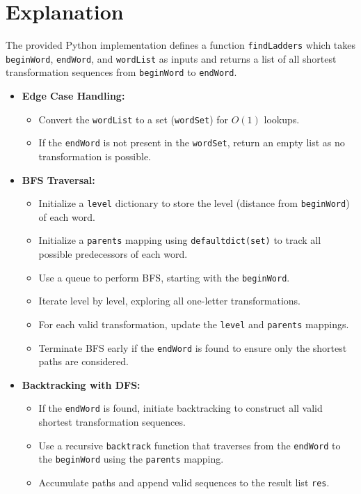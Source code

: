 \section*{Explanation}

The provided Python implementation defines a function \texttt{findLadders} which takes \texttt{beginWord}, \texttt{endWord}, and \texttt{wordList} as inputs and returns a list of all shortest transformation sequences from \texttt{beginWord} to \texttt{endWord}.

\begin{itemize}
    \item \textbf{Edge Case Handling:}
    \begin{itemize}
        \item Convert the \texttt{wordList} to a set (\texttt{wordSet}) for \(O(1)\) lookups.
        \item If the \texttt{endWord} is not present in the \texttt{wordSet}, return an empty list as no transformation is possible.
    \end{itemize}
    
    \item \textbf{BFS Traversal:}
    \begin{itemize}
        \item Initialize a \texttt{level} dictionary to store the level (distance from \texttt{beginWord}) of each word.
        \item Initialize a \texttt{parents} mapping using \texttt{defaultdict(set)} to track all possible predecessors of each word.
        \item Use a queue to perform BFS, starting with the \texttt{beginWord}.
        \item Iterate level by level, exploring all one-letter transformations.
        \item For each valid transformation, update the \texttt{level} and \texttt{parents} mappings.
        \item Terminate BFS early if the \texttt{endWord} is found to ensure only the shortest paths are considered.
    \end{itemize}
    
    \item \textbf{Backtracking with DFS:}
    \begin{itemize}
        \item If the \texttt{endWord} is found, initiate backtracking to construct all valid shortest transformation sequences.
        \item Use a recursive \texttt{backtrack} function that traverses from the \texttt{endWord} to the \texttt{beginWord} using the \texttt{parents} mapping.
        \item Accumulate paths and append valid sequences to the result list \texttt{res}.
    \end{itemize}
    

\end{itemize}
